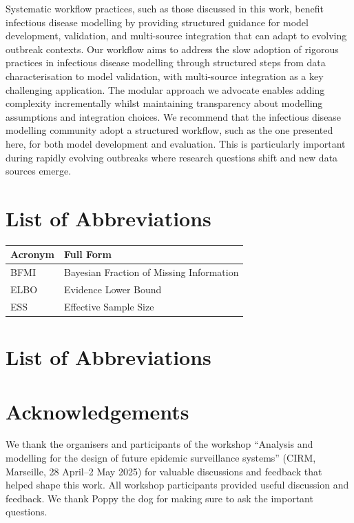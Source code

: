 \documentclass{article}
\begin{document}
Systematic workflow practices, such as those discussed in this work, benefit infectious disease modelling by providing structured guidance for model development, validation, and multi-source integration that can adapt to evolving outbreak contexts.
Our workflow aims to address the slow adoption of rigorous practices in infectious disease modelling through structured steps from data characterisation to model validation, with multi-source integration as a key challenging application.
The modular approach we advocate enables adding complexity incrementally whilst maintaining transparency about modelling assumptions and integration choices.
We recommend that the infectious disease modelling community adopt a structured workflow, such as the one presented here, for both model development and evaluation. This is particularly important during rapidly evolving outbreaks where research questions shift and new data sources emerge.

\section*{List of Abbreviations}
\begin{table}[h]
\centering
\begin{tabularx}{\textwidth}{lX}
\toprule
\textbf{Acronym} & \textbf{Full Form} \\
\midrule
BFMI & Bayesian Fraction of Missing Information \\
ELBO & Evidence Lower Bound \\
ESS & Effective Sample Size \\
\bottomrule
\end{tabularx}
\end{table}

\section*{List of Abbreviations}
\begin{acronym}
\end{acronym}

\section{Acknowledgements}

We thank the organisers and participants of the workshop ``Analysis and modelling for the design of future epidemic surveillance systems'' (CIRM, Marseille, 28 April–2 May 2025) for valuable discussions and feedback that helped shape this work.
All workshop participants provided useful discussion and feedback.
We thank Poppy the dog for making sure to ask the important questions.
\pagebreak


\end{document}
